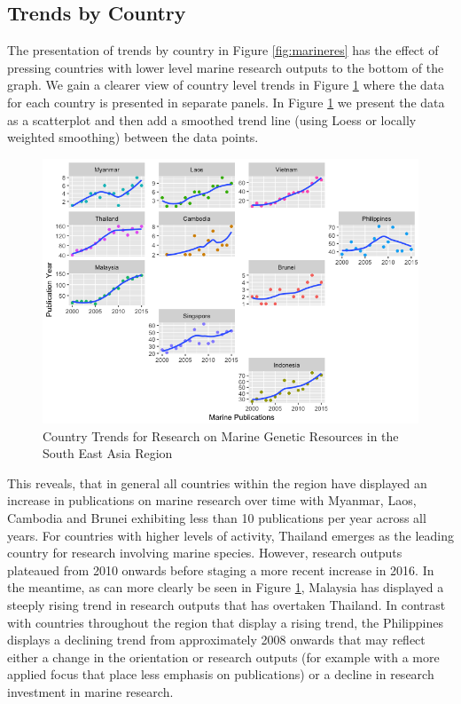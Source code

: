\documentclass[]{book}
\theoremstyle{definition}
\theoremstyle{definition}
\theoremstyle{definition}
\theoremstyle{remark}
\begin{document}
\hypertarget{trends-by-country}{%
\subsection{Trends by Country}\label{trends-by-country}}

The presentation of trends by country in Figure \ref{fig:marineres} has
the effect of pressing countries with lower level marine research
outputs to the bottom of the graph. We gain a clearer view of country
level trends in Figure \ref{fig:marinetrends} where the data for each
country is presented in separate panels. In Figure
\ref{fig:marinetrends} we present the data as a scatterplot and then add
a smoothed trend line (using Loess or locally weighted smoothing)
between the data points.

\begin{figure}

{\centering \includegraphics[width=1\linewidth]{images/country_trends} 

}

\caption{Country Trends for Research on Marine Genetic Resources in the South East Asia Region}\label{fig:marinetrends}
\end{figure}

This reveals, that in general all countries within the region have
displayed an increase in publications on marine research over time with
Myanmar, Laos, Cambodia and Brunei exhibiting less than 10 publications
per year across all years. For countries with higher levels of activity,
Thailand emerges as the leading country for research involving marine
species. However, research outputs plateaued from 2010 onwards before
staging a more recent increase in 2016. In the meantime, as can more
clearly be seen in Figure \ref{fig:marinetrends}, Malaysia has displayed
a steeply rising trend in research outputs that has overtaken Thailand.
In contrast with countries throughout the region that display a rising
trend, the Philippines displays a declining trend from approximately
2008 onwards that may reflect either a change in the orientation or
research outputs (for example with a more applied focus that place less
emphasis on publications) or a decline in research investment in marine
research.
\end{document}
